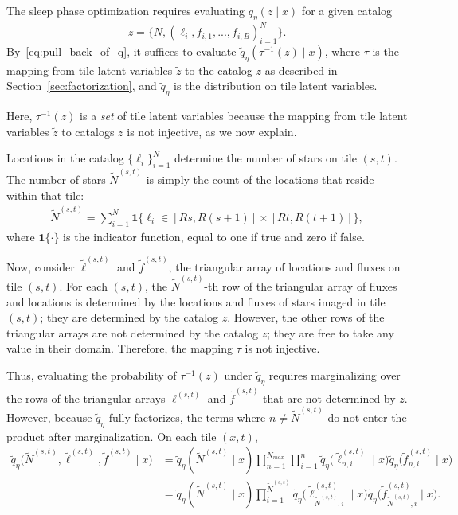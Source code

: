 The sleep phase optimization requires evaluating
$q_\eta(z \mid x)$ for a given catalog
\[z = \{N, (\ell_i, f_{i,1}, ..., f_{i,B})_{i = 1}^N\}.\]
By~\eqref{eq:pull_back_of_q}, 
it suffices to evaluate $\tilde q_\eta(\tau^{-1}(z) \mid x)$, 
where $\tau$ is the mapping from tile latent variables $\tilde z$ to the catalog $z$ as described in Section~\ref{sec:factorization}, 
and $\tilde q_\eta$ is the distribution on tile latent variables. 

Here, $\tau^{-1}(z)$ is a {\itshape set} of tile latent variables because the mapping from tile latent variables $\tilde z$ to catalogs $z$ is not injective, as we now explain.  

Locations in the catalog $\{\ell_i\}_{i=1}^N$
determine the number of stars on tile $(s,t)$. 
The number of stars $\tilde N^{(s,t)}$ is simply the count of the locations that reside within that tile:
\begin{align}
\tilde N^{(s,t)} = \sum_{i=1}^N 
\mathbf 1 \Big\{\ell_i\in [Rs, R(s+1)] \times [Rt, R(t+1)]\Big\},
\end{align}
where $\mathbf{1}\{\cdot\}$ is the indicator function, equal to one if true and zero if false.

Now, consider $\tilde\ell^{(s, t)}$ and $\tilde f^{(s, t)}$, the triangular array of locations and fluxes on tile $(s,t)$. 
For each $(s,t)$, the $\tilde N^{(s,t)}$-th row 
of the triangular array of fluxes and locations is
determined by the locations and fluxes of stars imaged in tile $(s,t)$; they are determined by the catalog $z$. However, the other rows 
of the triangular arrays are not determined by 
the catalog $z$; they are free to take any value in their domain. Therefore, the mapping $\tau$ is not injective. 

Thus, evaluating the probability of $\tau^{-1}(z)$ under $\tilde q_\eta$ requires marginalizing over the rows of the triangular arrays $\ell^{(s, t)}$ and $\tilde f^{(s, t)}$ that are not determined by $z$. However, 
because $\tilde q_\eta$ fully factorizes, the terms 
where $n \not= \tilde N^{(s,t)}$ do not enter the
product
after marginalization.
On each tile $(x,t)$,
\begin{align}
    \tilde q_\eta\big(\tilde N^{(s, t)}, \tilde \ell^{(s, t)}, \tilde f^{(s, t)} \mid x\big) &= 
    \tilde q_\eta(\tilde N^{(s,t)} \mid x) 
    \prod_{n = 1}^{N_{max}}\prod_{i = 1}^{n}
    \tilde q_\eta\big(\tilde \ell_{n,i}^{(s, t)} \mid x\big)
    \tilde q_\eta\big(\tilde f_{n,i}^{(s, t)} \mid x\big) \\
    &= \tilde q_\eta(\tilde N^{(s,t)} \mid x) 
    \prod_{i = 1}^{\tilde N^{(s,t)}}
    \tilde q_\eta\big(\tilde \ell_{\tilde N^{(s,t)},i}^{(s, t)} \mid x\big)
    \tilde q_\eta\big(\tilde f_{\tilde N^{(s,t)},i}^{(s, t)} \mid x\big).
\end{align}

